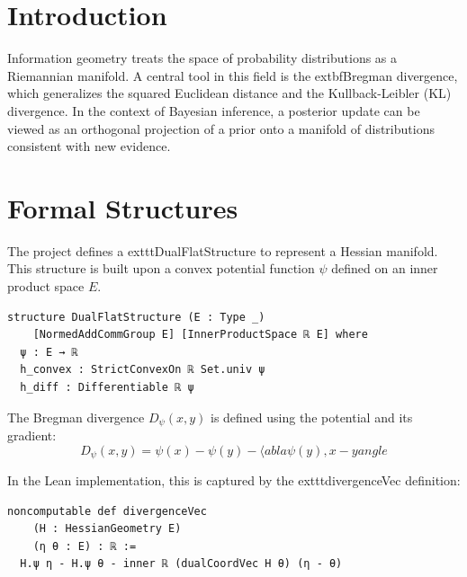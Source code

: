 \documentclass[11pt,a4paper]{article}
\author{Gemini CLI Analysis of 	exttt{info-geometry-lean}}
\date{February 24, 2026}
\begin{document}
\maketitle

\begin{abstract}
This paper discusses the formalization of information-geometric structures within the 	exttt{info-geometry-lean} codebase. We focus on the implementation of the Bregman-Pythagorean theorem and its application to Bayesian inference. By leveraging Lean 4's dependent type theory and the Mathlib library, the project provides a rigorous foundation for the geometric interpretation of statistical manifolds.
\end{abstract}

\section{Introduction}
Information geometry treats the space of probability distributions as a Riemannian manifold. A central tool in this field is the 	extbf{Bregman divergence}, which generalizes the squared Euclidean distance and the Kullback-Leibler (KL) divergence. In the context of Bayesian inference, a posterior update can be viewed as an orthogonal projection of a prior onto a manifold of distributions consistent with new evidence.

\section{Formal Structures}
The project defines a 	exttt{DualFlatStructure} to represent a Hessian manifold. This structure is built upon a convex potential function $\psi$ defined on an inner product space $E$.

\begin{lstlisting}
structure DualFlatStructure (E : Type _)
    [NormedAddCommGroup E] [InnerProductSpace ℝ E] where
  ψ : E → ℝ
  h_convex : StrictConvexOn ℝ Set.univ ψ
  h_diff : Differentiable ℝ ψ
\end{lstlisting}

The Bregman divergence $D_\psi(x, y)$ is defined using the potential and its gradient:
\[ D_\psi(x, y) = \psi(x) - \psi(y) - \langle 
abla \psi(y), x - y 
angle \]

In the Lean implementation, this is captured by the 	exttt{divergenceVec} definition:
\begin{lstlisting}
noncomputable def divergenceVec
    (H : HessianGeometry E)
    (η θ : E) : ℝ :=
  H.ψ η - H.ψ θ - inner ℝ (dualCoordVec H θ) (η - θ)
\end{lstlisting}
\end{document}
